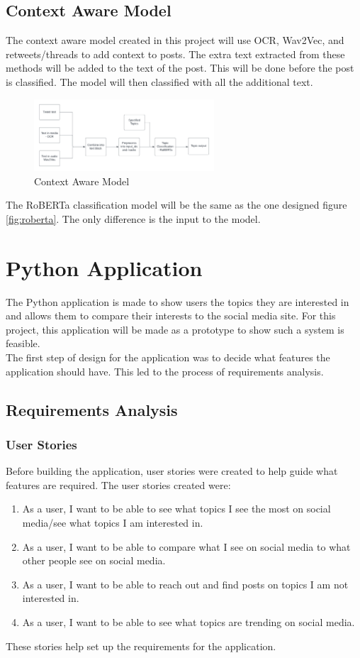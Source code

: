 \subsection{Context Aware Model}
The context aware model created in this project will use OCR, Wav2Vec, and retweets/threads to add context to posts. The extra text
extracted from these methods will be added to the text of the post. This will be done before the post is classified. The model will then
classified with all the additional text.
\begin{figure}
    \centering
    \includegraphics[width=0.6\textwidth]{../images/context-aware-model.png}
    \caption{Context Aware Model}
    \label{fig:context-aware-model}
\end{figure}

The RoBERTa classification model will be the same as the one designed figure \ref{fig:roberta}. The only difference is the input
to the model.
\section{Python Application}
The Python application is made to show users the topics they are interested in and allows them to compare their interests to the 
social media site. For this project, this application will be made as a prototype to show such a system is feasible.\\
The first step of design for the application was to decide what features the application should have. This led to the process of
requirements analysis.\\
\subsection{Requirements Analysis}
\subsubsection{User Stories}
Before building the application, user stories were created to help guide what features are required. The user stories created were:
\begin{enumerate}
    \item As a user, I want to be able to see what topics I see the most on social media/see what topics I am interested in.
    \item As a user, I want to be able to compare what I see on social media to what other people see on social media.
    \item As a user, I want to be able to reach out and find posts on topics I am not interested in.
    \item As a user, I want to be able to see what topics are trending on social media.
\end{enumerate}
These stories help set up the requirements for the application.
